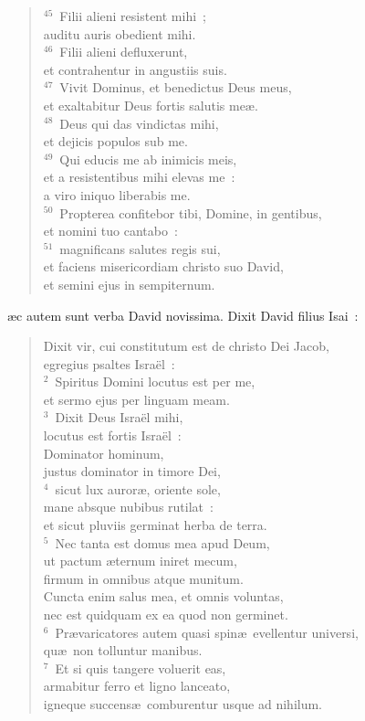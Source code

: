 \begin{verse}
${}^{45}$~Filii alieni resistent mihi~;\\ auditu auris obedient mihi.\\
${}^{46}$~Filii alieni defluxerunt,\\ et contrahentur in angustiis suis.\\
${}^{47}$~Vivit Dominus, et benedictus Deus meus,\\ et exaltabitur Deus fortis salutis me\ae .\\
${}^{48}$~Deus qui das vindictas mihi,\\ et dejicis populos sub me.\\
${}^{49}$~Qui educis me ab inimicis meis,\\ et a resistentibus mihi elevas me~:\\ a viro iniquo liberabis me.\\
${}^{50}$~Propterea confitebor tibi, Domine, in gentibus,\\ et nomini tuo cantabo~:\\
${}^{51}$~magnificans salutes regis sui,\\ et faciens misericordiam christo suo David,\\ et semini ejus in sempiternum.\end{verse}



\bchapter
{}\ae c autem sunt verba David novissima. Dixit David filius Isai~: \begin{verse}Dixit vir, cui constitutum est de christo Dei Jacob,\\ egregius psaltes Isra\"el~:\\
${}^{2}$~Spiritus Domini locutus est per me,\\ et sermo ejus per linguam meam.\\
${}^{3}$~Dixit Deus Isra\"el mihi,\\ locutus est fortis Isra\"el~:\\ Dominator hominum,\\ justus dominator in timore Dei,\\
${}^{4}$~sicut lux auror\ae , oriente sole,\\ mane absque nubibus rutilat~:\\ et sicut pluviis germinat herba de terra.\\
${}^{5}$~Nec tanta est domus mea apud Deum,\\ ut pactum \ae ternum iniret mecum,\\ firmum in omnibus atque munitum.\\ Cuncta enim salus mea, et omnis voluntas,\\ nec est quidquam ex ea quod non germinet.\\
${}^{6}$~Pr\ae varicatores autem quasi spin\ae\ evellentur universi,\\ qu\ae\ non tolluntur manibus.\\
${}^{7}$~Et si quis tangere voluerit eas,\\ armabitur ferro et ligno lanceato,\\ igneque succens\ae\ comburentur usque ad nihilum.\end{verse}


